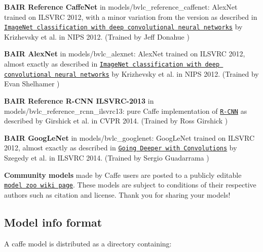 \begin{DoxyItemize}
\item {\bfseries B\+A\+IR Reference Caffe\+Net} in {\ttfamily models/bvlc\+\_\+reference\+\_\+caffenet}\+: Alex\+Net trained on I\+L\+S\+V\+RC 2012, with a minor variation from the version as described in \href{http://papers.nips.cc/paper/4824-imagenet-classification-with-deep-convolutional-neural-networks}{\tt Image\+Net classification with deep convolutional neural networks} by Krizhevsky et al. in N\+I\+PS 2012. (Trained by Jeff Donahue )
\item {\bfseries B\+A\+IR Alex\+Net} in {\ttfamily models/bvlc\+\_\+alexnet}\+: Alex\+Net trained on I\+L\+S\+V\+RC 2012, almost exactly as described in \href{http://papers.nips.cc/paper/4824-imagenet-classification-with-deep-convolutional-neural-networks}{\tt Image\+Net classification with deep convolutional neural networks} by Krizhevsky et al. in N\+I\+PS 2012. (Trained by Evan Shelhamer )
\item {\bfseries B\+A\+IR Reference R-\/\+C\+NN I\+L\+S\+V\+R\+C-\/2013} in {\ttfamily models/bvlc\+\_\+reference\+\_\+rcnn\+\_\+ilsvrc13}\+: pure Caffe implementation of \href{https://github.com/rbgirshick/rcnn}{\tt R-\/\+C\+NN} as described by Girshick et al. in C\+V\+PR 2014. (Trained by Ross Girshick )
\item {\bfseries B\+A\+IR Goog\+Le\+Net} in {\ttfamily models/bvlc\+\_\+googlenet}\+: Goog\+Le\+Net trained on I\+L\+S\+V\+RC 2012, almost exactly as described in \href{http://arxiv.org/abs/1409.4842}{\tt Going Deeper with Convolutions} by Szegedy et al. in I\+L\+S\+V\+RC 2014. (Trained by Sergio Guadarrama )
\end{DoxyItemize}

{\bfseries Community models} made by Caffe users are posted to a publicly editable \href{https://github.com/BVLC/caffe/wiki/Model-Zoo}{\tt model zoo wiki page}. These models are subject to conditions of their respective authors such as citation and license. Thank you for sharing your models!

\subsection*{Model info format}

A caffe model is distributed as a directory containing\+:


